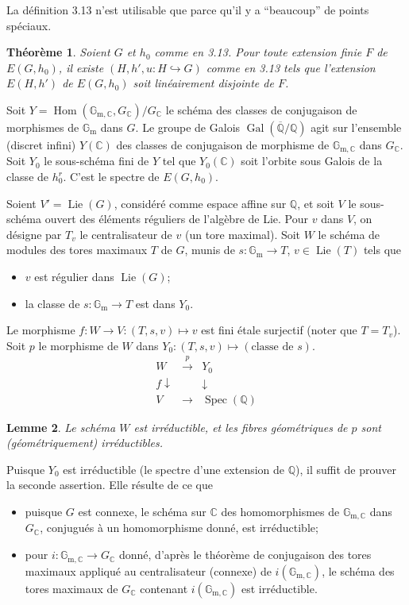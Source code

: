 \documentclass[11pt]{amsart}
\theoremstyle{plain}
\newtheorem{theorem}{Th\'eor\`eme}[section]
\newtheorem{lemma}[theorem]{Lemme}
\theoremstyle{definition}
\DeclareMathOperator{\Lie}{Lie}
\DeclareMathOperator{\Hom}{Hom}
\DeclareMathOperator{\Gal}{Gal}
\DeclareMathOperator{\Spec}{Spec}
\newcommand{\QQ}{\mathbb{Q}}
\newcommand{\CC}{\mathbb{C}}
\begin{document}
La d\'efinition 3.13 n'est utilisable que parce qu'il y a ``beaucoup'' de points sp\'eciaux.

\begin{theorem}
Soient $G$ et $h_0$ comme en 3.13. Pour toute extension finie $F$ de $E(G,h_0)$, il existe $(H, h', u : H \hookrightarrow G)$ comme en 3.13 tels que l'extension $E(H,h')$ de $E(G,h_0)$ soit lin\'eairement disjointe de $F$.
\end{theorem}

Soit $Y = \Hom(\mathbb{G}_{\mathrm{m},\CC}, G_{\CC})/G_{\CC}$ le sch\'ema des classes de conjugaison de morphismes de $\mathbb{G}_{\mathrm{m}}$ dans $G$. Le groupe de Galois $\Gal(\overline{\QQ}/\QQ)$ agit sur l'ensemble (discret infini) $Y(\CC)$ des classes de conjugaison de morphisme de $\mathbb{G}_{\mathrm{m},\CC}$ dans $G_{\CC}$. Soit $Y_0$ le sous-sch\'ema fini de $Y$ tel que $Y_0(\CC)$ soit l'orbite sous Galois de la classe de $h_0^r$. C'est le spectre de $E(G,h_0)$.

Soient $V' = \Lie(G)$, consid\'er\'e comme espace affine sur $\QQ$, et soit $V$ le sous-sch\'ema ouvert des \'el\'ements r\'eguliers de l'alg\`ebre de Lie. Pour $v$ dans $V$, on d\'esigne par $T_v$ le centralisateur de $v$ (un tore maximal). Soit $W$ le sch\'ema de modules des tores maximaux $T$ de $G$, munis de $s : \mathbb{G}_{\mathrm{m}} \to T$, $v \in \Lie(T)$ tels que
\begin{itemize}
\item[(a)] $v$ est r\'egulier dans $\Lie(G)$;
\item[(b)] la classe de $s : \mathbb{G}_{\mathrm{m}} \to T$ est dans $Y_0$.
\end{itemize}
Le morphisme $f : W \to V : (T, s, v) \mapsto v$ est fini \'etale surjectif (noter que $T = T_v$). Soit $p$ le morphisme de $W$ dans $Y_0 : (T,s,v) \mapsto (\text{classe de } s)$.
\[
\begin{array}{ccc}
W & \xrightarrow{\;p\;} & Y_0 \\
f \downarrow & & \downarrow \\
V & \longrightarrow & \Spec(\QQ)
\end{array}
\tag{5.1.1}
\]

\begin{lemma}
Le sch\'ema $W$ est irr\'eductible, et les fibres g\'eom\'etriques de $p$ sont (g\'eom\'etriquement) irr\'eductibles.
\end{lemma}

Puisque $Y_0$ est irr\'eductible (le spectre d'une extension de $\QQ$), il suffit de prouver la seconde assertion. Elle r\'esulte de ce que
\begin{itemize}
\item[(a)] puisque $G$ est connexe, le sch\'ema sur $\CC$ des homomorphismes de $\mathbb{G}_{\mathrm{m},\CC}$ dans $G_{\CC}$, conjugu\'es \`a un homomorphisme donn\'e, est irr\'eductible;
\item[(b)] pour $i : \mathbb{G}_{\mathrm{m},\CC} \to G_{\CC}$ donn\'e, d'apr\`es le th\'eor\`eme de conjugaison des tores maximaux appliqu\'e au centralisateur (connexe) de $i(\mathbb{G}_{\mathrm{m},\CC})$, le sch\'ema des tores maximaux de $G_{\CC}$ contenant $i(\mathbb{G}_{\mathrm{m},\CC})$ est irr\'eductible.
\end{itemize}
\end{document}
